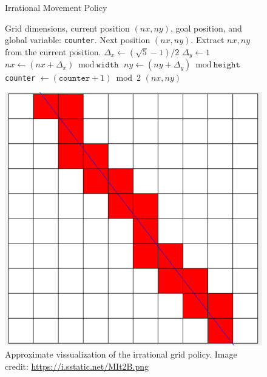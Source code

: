 \documentclass{article}
\begin{document}
\begin{figure}[H]
\centering
\begin{minipage}{0.5\textwidth}
    \begin{algorithm}[H]
        \caption{Irrational Movement Policy}\label{alg:diagonal}
        \begin{algorithmic}[1]
            \Require Grid dimensions, current position $(nx, ny)$, goal position, and global variable: \texttt{counter}.
            \Ensure Next position $(nx, ny)$.
            \State Extract $nx, ny$ from the current position.
            \State $\Delta_x \gets (\sqrt{5} - 1) / 2$ 
            \State $\Delta_y \gets 1$
             
            \State $nx \gets (nx + \Delta_x) \bmod \texttt{width}$
             
            \State $ny \gets (ny + \Delta_y) \bmod \texttt{height}$
            \EndIf
            \State \texttt{counter} $\gets (\texttt{counter} + 1) \bmod 2$
            \State \Return $(nx, ny)$
        \end{algorithmic}
    \end{algorithm}
    \end{minipage}
\hfill
\begin{minipage}{0.45\textwidth}
    \centering
    \includegraphics[width=\linewidth]{grid_irrational.png}
    \caption{Approximate vissualization of the irrational grid policy. Image credit: \url{https://i.sstatic.net/MIt2B.png}}
    \label{fig:visualization-of-diagonal-algorithm}
\end{minipage}
\end{figure}
\end{document}
